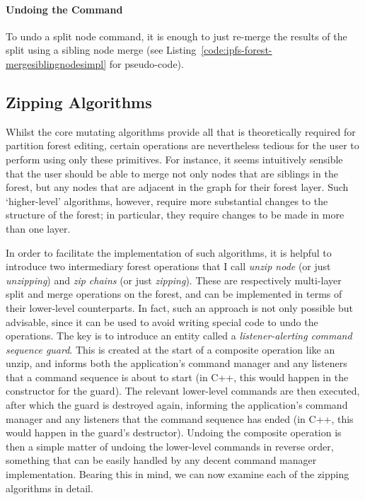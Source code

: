 \paragraph{Undoing the Command}

To undo a split node command, it is enough to just re-merge the results of the split using a sibling node merge (see Listing~\ref{code:ipfs-forest-mergesiblingnodesimpl} for pseudo-code).


\afterpage{\clearpage}
\newpage

\subsection{Zipping Algorithms}

Whilst the core mutating algorithms provide all that is theoretically required for partition forest editing, certain operations are nevertheless tedious for the user to perform using only these primitives. For instance, it seems intuitively sensible that the user should be able to merge not only nodes that are siblings in the forest, but any nodes that are adjacent in the graph for their forest layer. Such `higher-level' algorithms, however, require more substantial changes to the structure of the forest; in particular, they require changes to be made in more than one layer.

In order to facilitate the implementation of such algorithms, it is helpful to introduce two intermediary forest operations that I call \emph{unzip node} (or just \emph{unzipping}) and \emph{zip chains} (or just \emph{zipping}). These are respectively multi-layer split and merge operations on the forest, and can be implemented in terms of their lower-level counterparts. In fact, such an approach is not only possible but advisable, since it can be used to avoid writing special code to undo the operations. The key is to introduce an entity called a \emph{listener-alerting command sequence guard}. This is created at the start of a composite operation like an unzip, and informs both the application's command manager and any listeners that a command sequence is about to start (in C++, this would happen in the constructor for the guard). The relevant lower-level commands are then executed, after which the guard is destroyed again, informing the application's command manager and any listeners that the command sequence has ended (in C++, this would happen in the guard's destructor). Undoing the composite operation is then a simple matter of undoing the lower-level commands in reverse order, something that can be easily handled by any decent command manager implementation. Bearing this in mind, we can now examine each of the zipping algorithms in detail.

